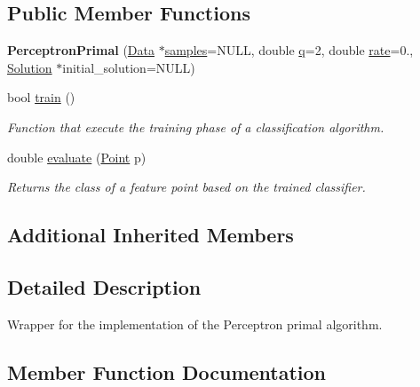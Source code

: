 \subsection*{Public Member Functions}
\begin{DoxyCompactItemize}
\item 
\mbox{\label{class_perceptron_primal_a3c182ca6be41096ac89aebcb45761660}} 
{\bfseries Perceptron\+Primal} (\hyperlink{class_data}{Data} $\ast$\hyperlink{class_classifier_a515c225d0da93df02ca79f9f87811d17}{samples}=N\+U\+LL, double \hyperlink{class_primal_classifier_a746ad2ff93fb77d82ae389f90dbdc89e}{q}=2, double \hyperlink{class_classifier_af9867e5919742de1303dd971a9a1c19a}{rate}=0., \hyperlink{class_solution}{Solution} $\ast$initial\+\_\+solution=N\+U\+LL)
\item 
bool \hyperlink{class_perceptron_primal_a17f817a72fc7d61d1686ea77f7f9e84d}{train} ()
\begin{DoxyCompactList}\small\item\em Function that execute the training phase of a classification algorithm. \end{DoxyCompactList}\item 
double \hyperlink{class_perceptron_primal_ac8ce9ceffe2b35b5386e5367fb419b3b}{evaluate} (\hyperlink{class_point}{Point} p)
\begin{DoxyCompactList}\small\item\em Returns the class of a feature point based on the trained classifier. \end{DoxyCompactList}\end{DoxyCompactItemize}
\subsection*{Additional Inherited Members}


\subsection{Detailed Description}
Wrapper for the implementation of the Perceptron primal algorithm. 

\subsection{Member Function Documentation}
\mbox{\label{class_perceptron_primal_ac8ce9ceffe2b35b5386e5367fb419b3b}} 
